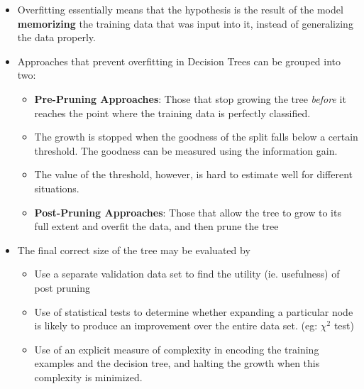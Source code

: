 \documentclass{article}
\theoremstyle{plain}
\theoremstyle{definition}
\begin{document}
\begin{itemize}
    \item Overfitting essentially means that the hypothesis is the result of the model \textbf{memorizing} the training data that was input into it, instead of generalizing the data properly.
    
    \item Approaches that prevent overfitting in Decision Trees can be grouped into two:
    \begin{itemize}
        \item \textbf{Pre-Pruning Approaches}: Those that stop growing the tree \textit{before} it reaches the point where the training data is perfectly classified.
        
        \item The growth is stopped when the goodness of the split falls below a certain threshold. The goodness can be measured using the information gain.
        
        \item The value of the threshold, however, is hard to estimate well for different situations.
        
        \item \textbf{Post-Pruning Approaches}: Those that allow the tree to grow to its full extent and overfit the data, and then prune the tree
    \end{itemize} 
    
    \item The final correct size of the tree may be evaluated by
    \begin{itemize}
        \item Use a separate validation data set to find the utility (ie. usefulness) of post pruning
        
        \item Use of statistical tests to determine whether expanding a particular node is likely to produce an improvement over the entire data set. (eg: $\chi^2$ test)
        
        \item Use of an explicit measure of complexity in encoding the training examples and the decision tree, and halting the growth when this complexity is minimized. 
    \end{itemize}
\end{itemize}
\end{document}
